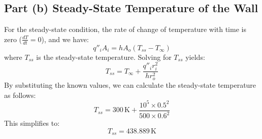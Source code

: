 \documentclass[12pt]{article}
\numberwithin{equation}{section}
\begin{document}
\subsection*{Part (b) Steady-State Temperature of the Wall}
For the steady-state condition, the rate of change of temperature with time is zero ($\frac{dT}{dt} = 0$), and we have:
\begin{equation}
    q''_i A_i = h A_o (T_{ss} - T_{\infty})
\end{equation}
where $T_{ss}$ is the steady-state temperature. Solving for $T_{ss}$ yields:
\begin{equation}
    T_{ss} = T_{\infty} + \frac{q''_i r_i^2}{h r_o^2}
\end{equation}
By substituting the known values, we can calculate the steady-state temperature as follows:
\begin{equation}
    T_{ss} = 300 \, \text{K} + \frac{10^5 \times 0.5^2}{500 \times 0.6^2}
\end{equation}
This simplifies to:
\begin{equation}
    T_{ss} = 438.889 \, \text{K}
\end{equation}
\end{document}
